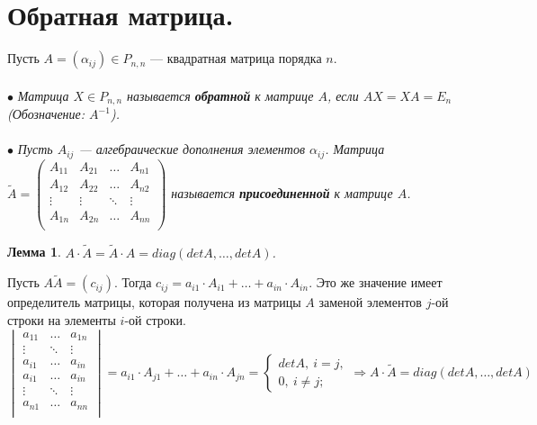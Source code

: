\section{Обратная матрица.}
Пусть $A = (\alpha_{ij}) \in P_{n,n}$ --- квадратная матрица порядка $n$.\\\\
$\bullet$ \textit{Матрица $X \in P_{n,n}$ называется \textbf{обратной} к матрице $A$, если $AX = XA = E_n$ (Обозначение: $A^{-1}$).}\\\\
$\bullet$ \textit{Пусть $A_{ij}$ --- алгебраические дополнения элементов $\alpha_{ij}$. Матрица $\widetilde{A} = \begin{pmatrix}
		A_{11} & A_{21} & \dots & A_{n1}\\
		A_{12} & A_{22} & \dots & A_{n2}\\
		\vdots & \vdots & \ddots & \vdots\\
		A_{1n} & A_{2n} & \dots & A_{nn}\\
	\end{pmatrix}$ называется \textbf{присоединенной} к матрице $A$.}
\newtheorem*{lem9_5_1}{Лемма}\begin{lem9_5_1}
	$A\cdot \widetilde{A} = \widetilde{A}\cdot A = diag(detA,\ldots, detA)$.
\end{lem9_5_1}\begin{Proof}
	Пусть $A\widetilde{A} = (c_{ij})$. Тогда $c_{ij} = a_{i1}\cdot A_{i1} + \ldots + a_{in}\cdot A_{in}$. Это же значение имеет определитель матрицы, которая получена из матрицы $A$ заменой элементов $j$-ой строки на элементы $i$-ой строки.\\
	$\begin{vmatrix}
		a_{11} & \dots & a_{1n}\\
		\vdots & \ddots & \vdots\\
		a_{i1} & \dots & a_{in}\\
		a_{i1} & \dots & a_{in}\\
		\vdots & \ddots & \vdots\\
		a_{n1} & \dots & a_{nn}\\
	\end{vmatrix} = a_{i1}\cdot A_{j1} + \ldots + a_{in}\cdot A_{jn} = \begin{cases}
		detA,\ i = j,\\
		0,\ i \ne j;
	\end{cases}\Rightarrow A\cdot\widetilde{A} = diag(detA,\ldots, detA)$
\end{Proof}\\\\
